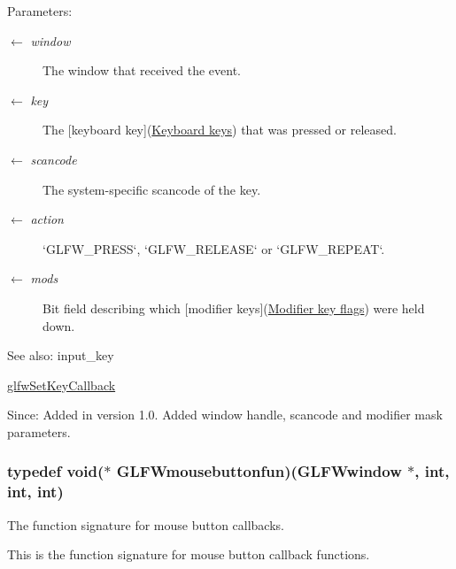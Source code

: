 \begin{Desc}
\item[Parameters:]
\begin{description}
\item[\mbox{$\leftarrow$} {\em window}]The window that received the event. \item[\mbox{$\leftarrow$} {\em key}]The \mbox{[}keyboard key\mbox{]}(\hyperlink{group__keys}{Keyboard keys}) that was pressed or released. \item[\mbox{$\leftarrow$} {\em scancode}]The system-specific scancode of the key. \item[\mbox{$\leftarrow$} {\em action}]`GLFW\_\-PRESS`, `GLFW\_\-RELEASE` or `GLFW\_\-REPEAT`. \item[\mbox{$\leftarrow$} {\em mods}]Bit field describing which \mbox{[}modifier keys\mbox{]}(\hyperlink{group__mods}{Modifier key flags}) were held down.\end{description}
\end{Desc}
\begin{Desc}
\item[See also:]input\_\-key 

\hyperlink{group__input_ga73bb92f628a2a0be9c132d56f19362c}{glfwSetKeyCallback}\end{Desc}
\begin{Desc}
\item[Since:]Added in version 1.0.  Added window handle, scancode and modifier mask parameters. \end{Desc}
\hypertarget{group__input_g1e008c7a8751cea648c8f42cc91104cf}{
\subsubsection[GLFWmousebuttonfun]{\setlength{\rightskip}{0pt plus 5cm}typedef void($\ast$  {\bf GLFWmousebuttonfun})({\bf GLFWwindow} $\ast$, int, int, int)}}
\label{group__input_g1e008c7a8751cea648c8f42cc91104cf}


The function signature for mouse button callbacks. 

This is the function signature for mouse button callback functions.

